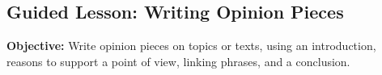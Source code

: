 \documentclass[12pt]{article}
\begin{document}
\subsection*{Guided Lesson: Writing Opinion Pieces}
\onehalfspacing

\begin{tcolorbox}[colframe=black!40, colback=gray!5, 
coltitle=black, colbacktitle=black!20, fonttitle=\bfseries\Large, 
title=Learning Objective, halign title=center, left=5pt, right=5pt, top=5pt, bottom=15pt]
\textbf{Objective:} Write opinion pieces on topics or texts, using an introduction, reasons to support a point of view, linking phrases, and a conclusion.  
\end{tcolorbox}

\vspace{1em}
\end{document}
